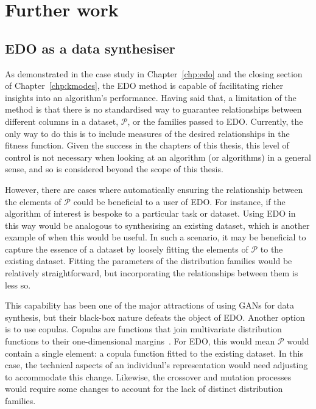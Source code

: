 \section{Further work}

\subsection*{EDO as a data synthesiser}

As demonstrated in the case study in Chapter~\ref{chp:edo} and the closing
section of Chapter~\ref{chp:kmodes}, the EDO method is capable of facilitating
richer insights into an algorithm's performance. Having said that, a limitation
of the method is that there is no standardised way to guarantee relationships
between different columns in a dataset, \(\mathcal P\), or the families passed to EDO.
Currently, the only way to do this is to include measures of the desired
relationships in the fitness function. Given the success in the chapters of this
thesis, this level of control is not necessary when looking at an algorithm (or
algorithms) in a general sense, and so is considered beyond the scope of this
thesis.

However, there are cases where automatically ensuring the relationship between
the elements of \(\mathcal P\) could be beneficial to a user of EDO. For
instance, if the algorithm of interest is bespoke to a particular task or
dataset. Using EDO in this way would be analogous to synthesising an existing
dataset, which is another example of when this would be useful. In such a
scenario, it may be beneficial to capture the essence of a dataset by loosely
fitting the elements of \(\mathcal P\) to the existing dataset. Fitting the
parameters of the distribution families would be relatively straightforward, but
incorporating the relationships between them is less so.

This capability has been one of the major attractions of using GANs for data
synthesis, but their black-box nature defeats the object of EDO. Another option
is to use copulas. Copulas are functions that join multivariate distribution
functions to their one-dimensional margins~\cite{Nelsen1999}. For EDO, this
would mean \(\mathcal P\) would contain a single element: a copula function
fitted to the existing dataset. In this case, the technical aspects of an
individual's representation would need adjusting to accommodate this change.
Likewise, the crossover and mutation processes would require some changes to
account for the lack of distinct distribution families.

